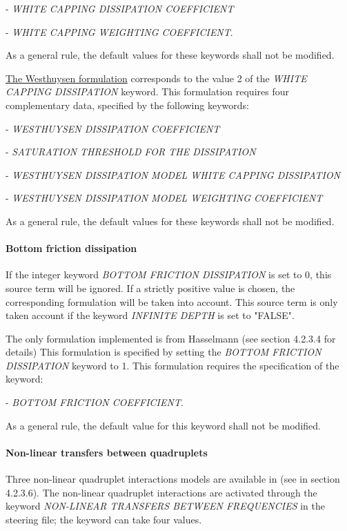 - \textit{WHITE CAPPING DISSIPATION COEFFICIENT}   

- \textit{WHITE CAPPING WEIGHTING COEFFICIENT}.

  \textit{}

 As a general rule, the default values for these keywords shall not be modified.

 \underline{  The Westhuysen formulation} corresponds to the value 2 of the \textit{WHITE CAPPING DISSIPATION} keyword. This formulation requires four complementary data, specified by the following keywords:  

-  \textit{WESTHUYSEN DISSIPATION COEFFICIENT}

-  \textit{SATURATION THRESHOLD FOR THE DISSIPATION}

-  \textit{WESTHUYSEN DISSIPATION MODEL WHITE CAPPING DISSIPATION}

-  \textit{WESTHUYSEN DISSIPATION MODEL WEIGHTING COEFFICIENT}

  \textit{}

As a general rule, the default values for these keywords shall not be modified.

\paragraph{ Bottom friction dissipation}

 If the integer keyword \textit{BOTTOM FRICTION DISSIPATION} is set to 0, this source term will be ignored. If a strictly positive value is chosen, the corresponding formulation will be taken into account. This source term is only taken account if the keyword \textit{INFINITE DEPTH} is set to "FALSE".

 The only formulation implemented is from Hasselmann (see section 4.2.3.4 for details) This formulation is specified by setting the \textit{BOTTOM FRICTION DISSIPATION} keyword to 1. This formulation requires the specification of the keyword:

  - \textit{BOTTOM FRICTION COEFFICIENT}.

 As a general rule, the default value for this keyword shall not be modified.


\paragraph{ Non-linear transfers between quadruplets}

 Three non-linear quadruplet interactions models are available in \tomawac (see in section 4.2.3.6). The non-linear quadruplet interactions are activated through the keyword \textit{NON-LINEAR TRANSFERS BETWEEN FREQUENCIES} in the steering file; the keyword can take four values.

